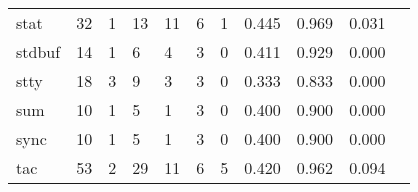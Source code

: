 \begin{longtable}{lp{1.2cm}p{1.2cm}p{1.2cm}p{1.2cm}p{1.2cm}p{1.2cm}p{1.2cm}p{1.2cm}p{1.2cm}p{1.2cm}}
stat      &                                    32 &                                                  1 &                                                 13 &                                                 11 &                                                  6 &                                                  1 &                                         0.445 &                                              0.969 &                                              0.031 \\
stdbuf    &                                    14 &                                                  1 &                                                  6 &                                                  4 &                                                  3 &                                                  0 &                                         0.411 &                                              0.929 &                                              0.000 \\
stty      &                                    18 &                                                  3 &                                                  9 &                                                  3 &                                                  3 &                                                  0 &                                         0.333 &                                              0.833 &                                              0.000 \\
sum       &                                    10 &                                                  1 &                                                  5 &                                                  1 &                                                  3 &                                                  0 &                                         0.400 &                                              0.900 &                                              0.000 \\
sync      &                                    10 &                                                  1 &                                                  5 &                                                  1 &                                                  3 &                                                  0 &                                         0.400 &                                              0.900 &                                              0.000 \\
tac       &                                    53 &                                                  2 &                                                 29 &                                                 11 &                                                  6 &                                                  5 &                                         0.420 &                                              0.962 &                                              0.094 \\

\end{longtable}
